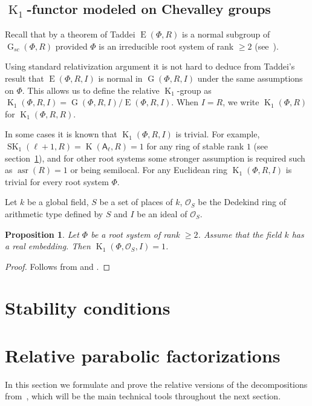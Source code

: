 \documentclass[oneside, 12pt]{amsart}
\theoremstyle{plain}
\numberwithin{equation}{section}
\numberwithin{lemma}{section}
\newtheorem{prop}[lemma]{Proposition}
\theoremstyle{definition}
\theoremstyle{remark}
\DeclareMathOperator{\K}{K}
\DeclareMathOperator{\SK}{SK}
\DeclareMathOperator{\G}{G}
\DeclareMathOperator{\E}{E}
\DeclareMathOperator{\asr}{asr}
\newcommand{\rA}{\mathsf{A}}
\begin{document}
\subsection{$\K_1$-functor modeled on Chevalley groups}
Recall that by a theorem of Taddei $\E(\Phi, R)$ is a normal subgroup of $\G_{sc}(\Phi, R)$ provided $\Phi$ is an irreducible root system of rank $\geqslant 2$ (see~\cite{Ta}).

Using standard relativization argument it is not hard to deduce from Taddei's result that $\E(\Phi, R, I)$ is normal in $\G(\Phi, R, I)$ under the same assumptions on $\Phi$.
This allows us to define the relative $\K_1$-group as $\K_1(\Phi, R, I)=\G(\Phi, R, I)/\E(\Phi, R, I).$
When $I=R$, we write $\K_1(\Phi, R)$ for $\K_1(\Phi, R, R)$.

In some cases it is known that $\K_1(\Phi, R, I)$ is trivial.
For example, $\SK_1(\ell+1, R)=\K(\rA_\ell, R)=1$ for any ring of stable rank $1$ (see section~\ref{sec:stability-conditions}), 
and for other root systems some stronger assumption is required such as $\asr(R)=1$ or being semilocal. 
For any Euclidean ring $\K_1(\Phi, R, I)$ is trivial for every root system $\Phi$.

Let $k$ be a global field, $S$ be a set of places of $k$, 
$\mathcal{O}_S$ be the Dedekind ring of arithmetic type defined by $S$ and $I$ be an ideal of $\mathcal{O}_S$.
\begin{prop} \label{prop:K1triv}
Let $\Phi$ be a root system of rank $\geqslant2$. Assume that the field $k$ has a real embedding. Then $\K_1(\Phi, \mathcal{O}_S, I)=1$.
\end{prop}
\begin{proof} Follows from \cite[Theorem~3.6]{BMS} and \cite[Corollary~4.5]{Ma69}. \end{proof}

\section{Stability conditions}\label{sec:stability-conditions}


\section{Relative parabolic factorizations} \label{sec:factorizations}
In this section we formulate and prove the relative versions of the decompositions from~\cite{St78}, which will be the main technical tools throughout the next section.
\end{document}
